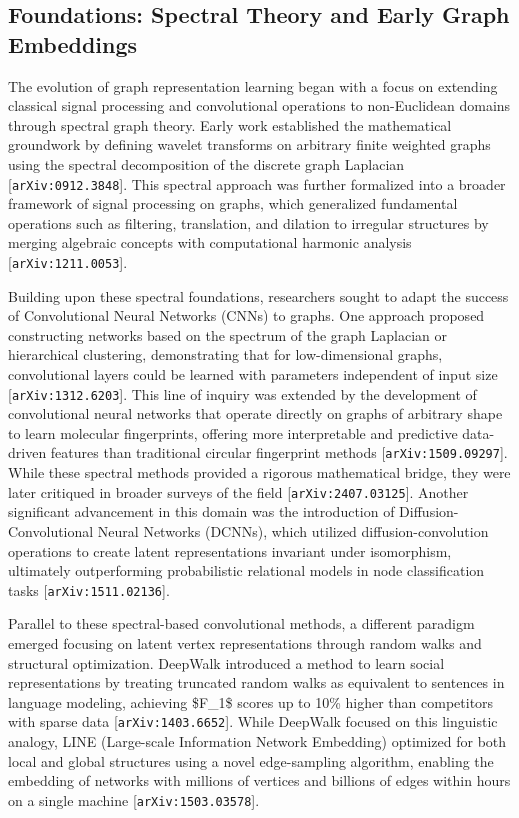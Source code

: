 \documentclass[11pt]{article}
\begin{document}
\subsection{Foundations: Spectral Theory and Early Graph Embeddings}

The evolution of graph representation learning began with a focus on extending classical signal processing and convolutional operations to non-Euclidean domains through spectral graph theory. Early work established the mathematical groundwork by defining wavelet transforms on arbitrary finite weighted graphs using the spectral decomposition of the discrete graph Laplacian [\texttt{arXiv:0912.3848}]. This spectral approach was further formalized into a broader framework of signal processing on graphs, which generalized fundamental operations such as filtering, translation, and dilation to irregular structures by merging algebraic concepts with computational harmonic analysis [\texttt{arXiv:1211.0053}].

Building upon these spectral foundations, researchers sought to adapt the success of Convolutional Neural Networks (CNNs) to graphs. One approach proposed constructing networks based on the spectrum of the graph Laplacian or hierarchical clustering, demonstrating that for low-dimensional graphs, convolutional layers could be learned with parameters independent of input size [\texttt{arXiv:1312.6203}]. This line of inquiry was extended by the development of convolutional neural networks that operate directly on graphs of arbitrary shape to learn molecular fingerprints, offering more interpretable and predictive data-driven features than traditional circular fingerprint methods [\texttt{arXiv:1509.09297}]. While these spectral methods provided a rigorous mathematical bridge, they were later critiqued in broader surveys of the field [\texttt{arXiv:2407.03125}]. Another significant advancement in this domain was the introduction of Diffusion-Convolutional Neural Networks (DCNNs), which utilized diffusion-convolution operations to create latent representations invariant under isomorphism, ultimately outperforming probabilistic relational models in node classification tasks [\texttt{arXiv:1511.02136}].

Parallel to these spectral-based convolutional methods, a different paradigm emerged focusing on latent vertex representations through random walks and structural optimization. DeepWalk introduced a method to learn social representations by treating truncated random walks as equivalent to sentences in language modeling, achieving \$F\_1\$ scores up to 10\% higher than competitors with sparse data [\texttt{arXiv:1403.6652}]. While DeepWalk focused on this linguistic analogy, LINE (Large-scale Information Network Embedding) optimized for both local and global structures using a novel edge-sampling algorithm, enabling the embedding of networks with millions of vertices and billions of edges within hours on a single machine [\texttt{arXiv:1503.03578}].
\end{document}
